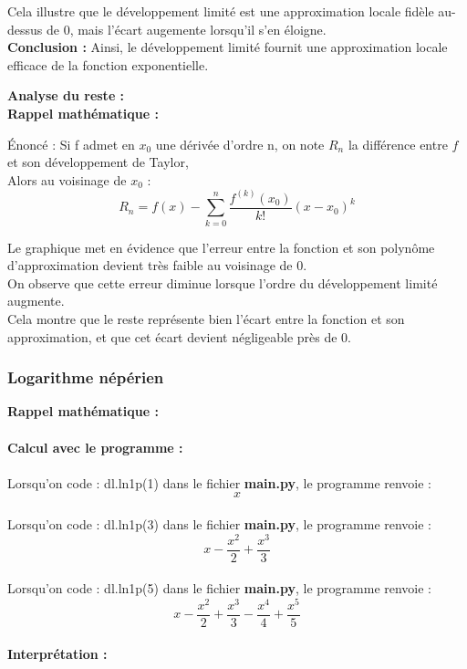 \documentclass{article}
\begin{document}
Cela illustre que le développement limité est une approximation locale fidèle au-dessus de 0, mais l'écart augemente lorsqu'il s'en éloigne.\\

\textbf{Conclusion :} Ainsi, le développement limité fournit une approximation locale efficace de la fonction exponentielle.



\textbf{Analyse du reste :}\\

\textbf{Rappel mathématique : } \\

{Énoncé : Si f admet en $x_0$ une dérivée d'ordre n, on note $R_n$ la différence entre $f$
et son développement de Taylor, \\
Alors au voisinage de $x_0$ : 
$$R_n = f(x) - \displaystyle\sum_{k=0}^{n} \frac{f^{(k)}(x_0)}{k!}(x - x_0)^k $$
}{}


Le graphique met en évidence que l’erreur entre la fonction et son polynôme d’approximation devient très faible au voisinage de 0.\\

On observe que cette erreur diminue lorsque l’ordre du développement limité augmente.\\

Cela montre que le reste représente bien l’écart entre la fonction et son approximation, et que cet écart devient négligeable près de 0.


\subsubsection{Logarithme népérien}
\textbf{Rappel mathématique : } \\
\\


\textbf{Calcul avec le programme :} \\
\\
Lorsqu'on code : dl.ln1p(1) dans le fichier \textbf{main.py}, le programme renvoie : $$x$$ \\
Lorsqu'on code : dl.ln1p(3) dans le fichier \textbf{main.py}, le programme renvoie : $$x-\frac{x^2}{2}+\frac{x^3}{3}$$ \\
Lorsqu'on code : dl.ln1p(5) dans le fichier \textbf{main.py}, le programme renvoie : $$x-\frac{x^2}{2}+\frac{x^3}{3}-\frac{x^4}{4}+\frac{x^5}{5}$$ \\
\textbf{Interprétation :} \\
\end{document}

